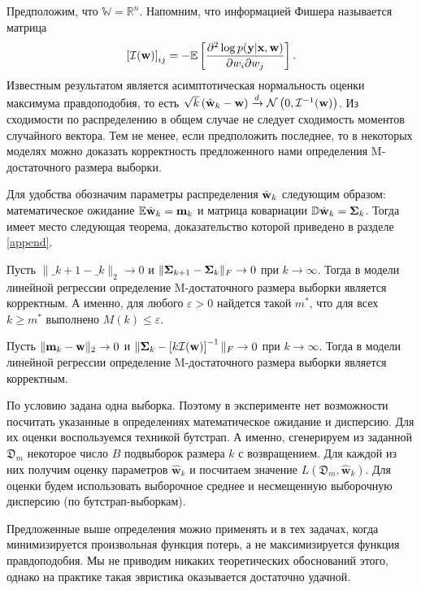 Предположим, что $\mathbb{W} = \mathbb{R}^n$. Напомним, что информацией Фишера называется матрица
\[ \left[\mathcal{I}(\mathbf{w})\right]_{ij} = - \mathbb{E}\left[ \dfrac{\partial^2 \log p(\mathbf{y} | \mathbf{x}, \mathbf{w})}{\partial w_i \partial w_j} \right]. \]
Известным результатом является асимптотическая нормальность оценки максимума правдоподобия, то есть $\sqrt{k}\left( \hat{\mathbf{w}}_k - \mathbf{w} \right) \xrightarrow{d} \mathcal{N}\left(0, \mathcal{I}^{-1}(\mathbf{w})\right)$. Из сходимости по распределению в общем случае не следует сходимость моментов случайного вектора. Тем не менее, если предположить последнее, то в некоторых моделях можно доказать корректность предложенного нами определения M-достаточного размера выборки.

Для удобства обозначим параметры распределения $\hat{\mathbf{w}}_k$ следующим образом: математическое ожидание $\mathbb{E} \hat{\mathbf{w}}_k = \mathbf{m}_k$ и матрица ковариации $\mathbb{D} \hat{\mathbf{w}}_k = \boldsymbol{\Sigma}_k$. Тогда имеет место следующая теорема, доказательство которой приведено в разделе \ref{append}.

\begin{theorem}[Киселев, 2023]\label{theorem1}
    Пусть $\| \bm_{k+1} - \bm_k \|_2 \to 0$ и $\| \boldsymbol{\Sigma}_{k+1} - \boldsymbol{\Sigma}_k \|_{F} \to 0$ при $k \to \infty$. Тогда в модели линейной регрессии определение M-достаточного размера выборки является корректным. А именно, для любого $\varepsilon > 0$ найдется такой $m^*$, что для всех $k \geqslant m^*$ выполнено $M(k) \leqslant \varepsilon$.
\end{theorem}

\begin{corollary}
    Пусть $\| \mathbf{m}_k - \mathbf{w} \|_2 \to 0$ и $\| \boldsymbol{\Sigma}_k - \left[k\mathcal{I}(\mathbf{w})\right]^{-1} \|_{F} \to 0$ при $k \to \infty$. Тогда в модели линейной регрессии определение M-достаточного размера выборки является корректным. 
\end{corollary}

По условию задана одна выборка. Поэтому в эксперименте нет возможности посчитать указанные в определениях математическое ожидание и дисперсию. Для их оценки воспользуемся техникой бутстрап. А именно, сгенерируем из заданной $\mathfrak{D}_m$ некоторое число $B$ подвыборок размера $k$ с возвращением. Для каждой из них получим оценку параметров $\hat{\mathbf{w}}_{k}$ и посчитаем значение $L(\mathfrak{D}_m, \hat{\mathbf{w}}_{k})$. Для оценки будем использовать выборочное среднее и несмещенную выборочную дисперсию (по бутстрап-выборкам).

Предложенные выше определения можно применять и в тех задачах, когда минимизируется произвольная функция потерь, а не максимизируется функция правдоподобия. Мы не приводим никаких теоретических обоснований этого, однако на практике такая эвристика оказывается достаточно удачной.

